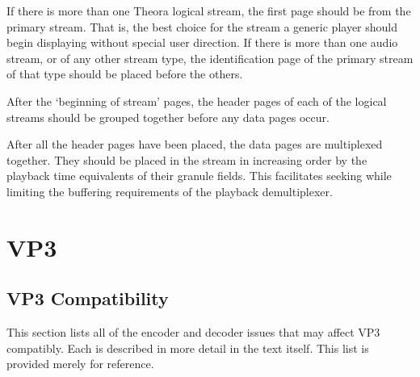 \documentclass[9pt,letterpaper]{book}
\numberwithin{equation}{chapter}
\numberwithin{figure}{chapter}
\numberwithin{table}{chapter}
\begin{document}
If there is more than one Theora logical stream, the first page should
 be from the primary stream.
That is, the best choice for the stream a generic player should begin
 displaying without special user direction.
If there is more than one audio stream, or of any other stream
 type, the identification page of the primary stream of that type
 should be placed before the others.

After the `beginning of stream' pages, the header pages of each of
 the logical streams should be grouped together before any data pages
 occur.

After all the header pages have been placed,
 the data pages are multiplexed together.
They should be placed in the stream in increasing order by the playback
 time equivalents of their granule fields.
This facilitates seeking while limiting the buffering requirements of the
 playback demultiplexer.

\cleardoublepage
\chapter{VP3}

\section{VP3 Compatibility}
\label{app:vp3-compat}
This section lists all of the encoder and decoder issues that may affect VP3
 compatibly.
Each is described in more detail in the text itself.
This list is provided merely for reference.
\end{document}
